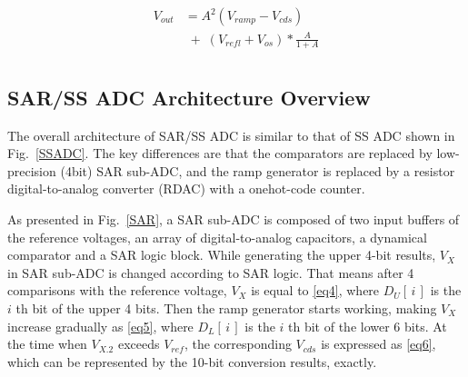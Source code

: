 \begin{equation}
	\begin{aligned}
		V_{out}&=A^2(V_{ramp}-V_{cds})\\
		&\;{+}\;\left(V_{refl}+V_{os}\right)\ast\frac{A}{1+A}\\ 		
		\label{eq3}
	\end{aligned}
\end{equation}

\subsection{SAR/SS ADC Architecture Overview}\label{over2}

The overall architecture of SAR/SS ADC is similar to that of SS ADC shown in Fig.~\ref{SSADC}. The key differences are that the comparators are replaced by low-precision (4bit) SAR sub-ADC, and
the ramp generator is replaced by a resistor digital-to-analog converter (RDAC) with a onehot-code counter.

As presented in Fig.~\ref{SAR}, a SAR sub-ADC is composed of two input buffers of the reference voltages, an array of digital-to-analog capacitors, a dynamical comparator and a SAR logic block. While generating the upper 4-bit results, $V_{X}$ in SAR sub-ADC is changed according to SAR logic. That means after 4 comparisons 
with the reference voltage, $V_{X}$ is equal to \eqref{eq4}, where $D_{U}\left[\,i\,\right]$ is the $i$ th bit of the upper 4 bits. 
Then the ramp generator starts working, making $V_{X}$ increase gradually as \eqref{eq5}, where $D_{L}\left[\,i\,\right]$ is the $i$ th bit of the lower 6 bits. 
At the time when $V_{X.2}$ exceeds $V_{ref}$, the corresponding $V_{cds}$ is expressed as \eqref{eq6}, which can be represented by the 10-bit conversion results, exactly.


